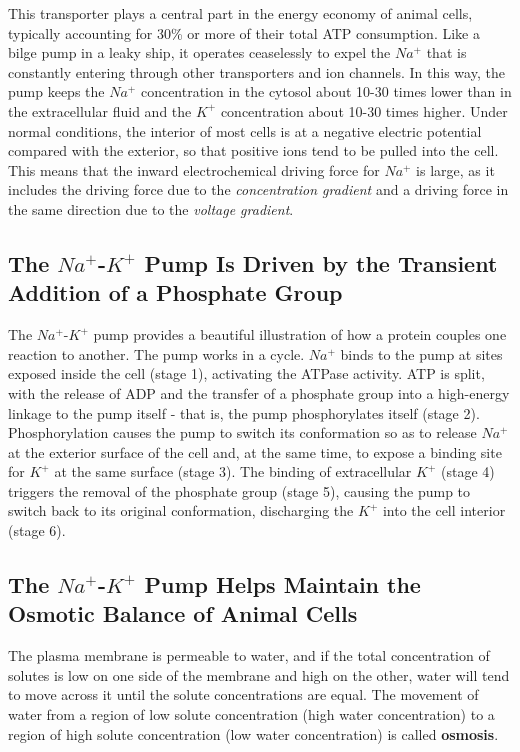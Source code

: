 This transporter plays a central part in the energy economy of animal
cells, typically accounting for 30\% or more of their total ATP consumption.
Like a bilge pump in a leaky ship, it operates ceaselessly to expel the
$Na^{+}$ that is constantly entering through other transporters and ion channels.
In this way, the pump keeps the $Na^{+}$ concentration in the cytosol
about 10-30 times lower than in the extracellular fluid and the $K^{+}$ concentration
about 10-30 times higher. Under normal
conditions, the interior of most cells is at a negative electric potential
compared with the exterior, so that positive ions tend to be pulled into
the cell. This means that the inward electrochemical driving force for $Na^{+}$
is large, as it includes the driving force due to the \textit{concentration gradient}
and a driving force in the same direction due to the \textit{voltage gradient}.

\subsection{The $Na^{+}$-$K^{+}$ Pump Is Driven by the Transient Addition of a Phosphate Group}

The $Na^{+}$-$K^{+}$ pump provides a beautiful illustration of how a protein
couples one reaction to another. The pump works in a cycle.
$Na^{+}$ binds to the pump at sites exposed inside the cell (stage 1),
activating the ATPase activity. ATP is split, with the release of ADP and
the transfer of a phosphate group into a high-energy linkage to the pump
itself - that is, the pump phosphorylates itself (stage 2). Phosphorylation
causes the pump to switch its conformation so as to release $Na^{+}$ at the
exterior surface of the cell and, at the same time, to expose a binding
site for $K^{+}$ at the same surface (stage 3). The binding of extracellular $K^{+}$
(stage 4) triggers the removal of the phosphate group (stage 5), causing
the pump to switch back to its original conformation, discharging the $K^{+}$
into the cell interior (stage 6).

\subsection{The $Na^{+}$-$K^{+}$ Pump Helps Maintain the Osmotic Balance of Animal Cells}

The plasma membrane is permeable to water, and if
the total concentration of solutes is low on one side of the membrane
and high on the other, water will tend to move across it until the solute
concentrations are equal. The movement of water from a region of low
solute concentration (high water concentration) to a region of high solute
concentration (low water concentration) is called \textbf{osmosis}. 

